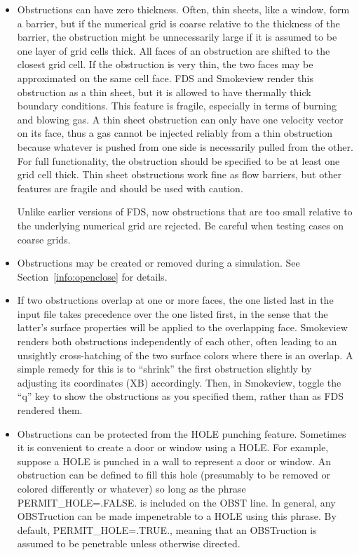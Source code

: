\documentclass[11pt]{book}
\begin{document}
\begin{itemize}
\item Obstructions can have zero thickness. Often, thin sheets, like a window, form a barrier,
but if the numerical grid is coarse relative to the thickness of the barrier, the obstruction
might be unnecessarily large if it is assumed to be one layer of grid cells thick. All faces
of an obstruction are shifted to the closest grid cell. If the obstruction is very thin, the two
faces may be approximated on the same cell face. FDS and Smokeview render
this obstruction as a thin sheet, but it is allowed to have thermally
thick boundary conditions. This feature is fragile, especially in terms
of burning and blowing gas. A thin sheet obstruction can only have one velocity
vector on its face, thus a gas cannot be injected reliably from a
thin obstruction because whatever is pushed from one side is necessarily pulled from the other.
For full functionality, the obstruction should be specified to
be at least one grid cell thick. Thin sheet obstructions
work fine as flow barriers, but other features are fragile and should be used with
caution.
\begin{warning}
\noindent
Unlike earlier versions of FDS, now obstructions that are
too small relative to the underlying numerical grid are rejected.
Be careful when testing cases on coarse grids.
\end{warning}
\item Obstructions may be created or removed during a simulation. See
Section~\ref{info:openclose} for details.
\item If two obstructions overlap at one or more faces, the one listed last in the input file takes precedence over the one
listed first, in the sense that the latter's surface properties will be applied to the overlapping face. Smokeview renders both obstructions
independently of each other, often leading to an unsightly cross-hatching of the two surface colors where there is an overlap. A
simple remedy for this is to ``shrink'' the first obstruction slightly by adjusting its coordinates ({\ct XB}) accordingly. Then, in
Smokeview, toggle the ``q'' key to show the obstructions as you specified them, rather than as FDS rendered them.
\item Obstructions can be protected from the {\ct HOLE} punching feature. Sometimes
it is convenient to create a door or window using a {\ct HOLE}. For example, suppose a
{\ct HOLE} is punched in a wall to represent a door or window. An obstruction can be
defined to fill this hole (presumably to be removed or colored differently or whatever) so
long as the phrase {\ct PERMIT\_HOLE=.FALSE.} is included on the {\ct OBST} line. In general,
any {\ct OBST}ruction can be made impenetrable to a {\ct HOLE} using this phrase. By default,
{\ct PERMIT\_HOLE=.TRUE.}, meaning that an {\ct OBST}ruction is assumed to be penetrable unless
otherwise directed.
\end{itemize}
\end{document}

